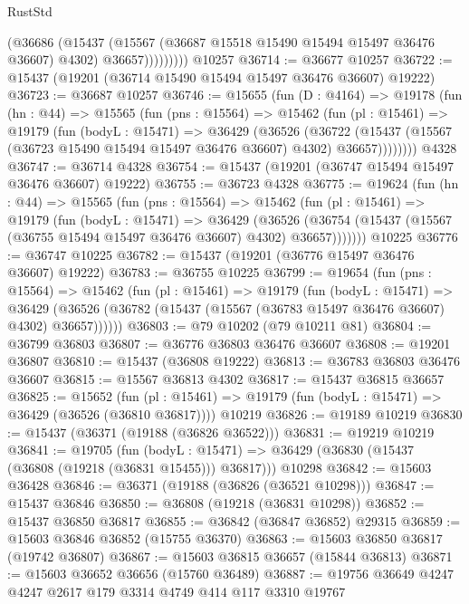 \begin{lexlean}{RustStd}
\begin{coremodule}
                  (@36686
                    (@15437
                      (@15567 (@36687 @15518 @15490 @15494 @15497 @36476 @36607) @4302)
                      @36657)))))))))
    @10257
@36714 := @36677 @10257
@36722 := @15437 (@19201 (@36714 @15490 @15494 @15497 @36476 @36607) @19222)
@36723 := @36687 @10257
@36746 := @15655
    (fun (D : @4164) =>
    @19178
      (fun (hn : @44) =>
      @15565
        (fun (pns : @15564) =>
        @15462
          (fun (pl : @15461) =>
          @19179
            (fun (bodyL : @15471) =>
            @36429
              (@36526
                (@36722
                  (@15437 (@15567 (@36723 @15490 @15494 @15497 @36476 @36607) @4302) @36657))))))))
    @4328
@36747 := @36714 @4328
@36754 := @15437 (@19201 (@36747 @15494 @15497 @36476 @36607) @19222)
@36755 := @36723 @4328
@36775 := @19624
    (fun (hn : @44) =>
    @15565
      (fun (pns : @15564) =>
      @15462
        (fun (pl : @15461) =>
        @19179
          (fun (bodyL : @15471) =>
          @36429
            (@36526
              (@36754 (@15437 (@15567 (@36755 @15494 @15497 @36476 @36607) @4302) @36657)))))))
    @10225
@36776 := @36747 @10225
@36782 := @15437 (@19201 (@36776 @15497 @36476 @36607) @19222)
@36783 := @36755 @10225
@36799 := @19654
    (fun (pns : @15564) =>
    @15462
      (fun (pl : @15461) =>
      @19179
        (fun (bodyL : @15471) =>
        @36429 (@36526 (@36782 (@15437 (@15567 (@36783 @15497 @36476 @36607) @4302) @36657))))))
@36803 := @79 @10202 (@79 @10211 @81)
@36804 := @36799 @36803
@36807 := @36776 @36803 @36476 @36607
@36808 := @19201 @36807
@36810 := @15437 (@36808 @19222)
@36813 := @36783 @36803 @36476 @36607
@36815 := @15567 @36813 @4302
@36817 := @15437 @36815 @36657
@36825 := @15652
    (fun (pl : @15461) => @19179 (fun (bodyL : @15471) => @36429 (@36526 (@36810 @36817))))
    @10219
@36826 := @19189 @10219
@36830 := @15437 (@36371 (@19188 (@36826 @36522)))
@36831 := @19219 @10219
@36841 := @19705
    (fun (bodyL : @15471) => @36429 (@36830 (@15437 (@36808 (@19218 (@36831 @15455))) @36817)))
    @10298
@36842 := @15603 @36428
@36846 := @36371 (@19188 (@36826 (@36521 @10298)))
@36847 := @15437 @36846
@36850 := @36808 (@19218 (@36831 @10298))
@36852 := @15437 @36850 @36817
@36855 := @36842 (@36847 @36852) @29315
@36859 := @15603 @36846 @36852 (@15755 @36370)
@36863 := @15603 @36850 @36817 (@19742 @36807)
@36867 := @15603 @36815 @36657 (@15844 @36813)
@36871 := @15603 @36652 @36656 (@15760 @36489)
@36887 := @19756
    @36649
    @4247
    @4247
    @2617
    @179
    @3314
    @4749
    @414
    @117
    @3310
    @19767

\end{coremodule}
\end{lexlean}
